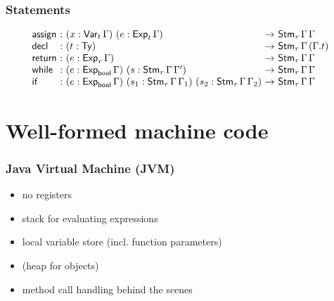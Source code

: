 \documentclass[t,fleqn,usenames,dvipsnames]{beamer}
\newcommand{\Var}[2][]{\mathsf{Var}_{#1}\,#2}
\newcommand{\Exp}[2][]{\mathsf{Exp}_{#1}\,#2}
\newcommand{\Stm}[3][]{\mathsf{Stm}_{#1}\,#2\,#3}
\newcommand{\vrt}{\mathit{r}}
\newcommand{\tassign}{\mathsf{assign}}
\newcommand{\twhile}{\mathsf{while}}
\newcommand{\tdecl}{\mathsf{decl}}
\newcommand{\treturn}{\mathsf{return}}
\newcommand{\tbool}{\mathsf{bool}}
\begin{document}
\begin{frame}%
  \frametitle{Statements}
  \vspace{-3ex}
\[
\begin{array}{@{}l@{~}c@{~}l@{~}c@{~}l}
  \tassign & : & (x : \Var[t]\Gamma)\ (e : \Exp[t]\Gamma) & \to & \Stm[\vrt]\Gamma\Gamma \\
  \tdecl   & : & (t : \Ty) & \to & \Stm[\vrt]\Gamma{(\Gamma.t)} \\
  \treturn & : & (e : \Exp[\vrt]\Gamma) & \to & \Stm[\vrt]\Gamma\Gamma \\
  \twhile & : & (e : \Exp[\tbool]\Gamma)\
                 (s : \Stm[\vrt]\Gamma{\Gamma'}) & \to & \Stm[\vrt]\Gamma\Gamma \\
  \tif    & : & (e : \Exp[\tbool]\Gamma)\
                 (s_1 : \Stm[\vrt]\Gamma{\Gamma_1})\
                 (s_2 : \Stm[\vrt]\Gamma{\Gamma_2}) & \to & \Stm[\vrt]\Gamma\Gamma \\
\end{array}
\]
\end{frame}


\section{Well-formed machine code}

\begin{frame}%
  \frametitle{Java Virtual Machine (JVM)}
  \vspace{-3ex}
  \begin{itemize}
  \item no registers
  \item stack for evaluating expressions
  \item local variable store (incl. function parameters)
  \item (heap for objects)
  \item method call handling behind the scenes
  \end{itemize}
\end{frame}
\end{document}
